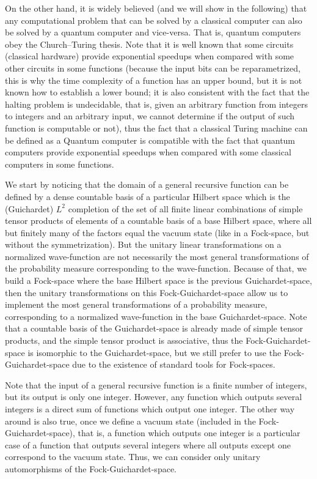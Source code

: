 \documentclass[11pt]{book}
\begin{document}
On the other hand, it is widely believed (and we will show in the
following) that any computational problem that can be solved by a
classical computer can also be solved by a quantum computer and
vice-versa. That is, quantum computers obey the Church--Turing thesis.
Note that it is well known that some circuits (classical hardware)
provide exponential speedups when compared with some other circuits in
some functions (because the input bits can be reparametrized, this is
why the time complexity of a function has an upper bound, but it is not
known how to establish a lower bound; it is also consistent with the
fact that the halting problem is undecidable, that is, given an
arbitrary function from integers to integers and an arbitrary input, we
cannot determine if the output of such function is computable or not),
thus the fact that a classical Turing machine can be defined as a
Quantum computer is compatible with the fact that quantum computers
provide exponential speedups when compared with some classical computers
in some functions.

We start by noticing that the domain of a general recursive function can
be defined by a dense countable basis of a particular Hilbert space
which is the (Guichardet) \(L^2\) completion of the set of all finite
linear combinations of simple tensor products of elements of a countable
basis of a base Hilbert space, where all but finitely many of the
factors equal the vacuum
state\cite{bratteli1987operator} (like in a Fock-space, but without the symmetrization). But the
unitary linear transformations on a normalized wave-function are not
necessarily the most general transformations of the probability measure
corresponding to the wave-function. Because of that, we build a
Fock-space where the base Hilbert space is the previous
Guichardet-space, then the unitary transformations on this
Fock-Guichardet-space allow us to implement the most general
transformations of a probability measure, corresponding to a normalized
wave-function in the base Guichardet-space. Note that a countable basis
of the Guichardet-space is already made of simple tensor products, and
the simple tensor product is associative, thus the Fock-Guichardet-space
is isomorphic to the Guichardet-space, but we still prefer to use the
Fock-Guichardet-space due to the existence of standard tools for
Fock-spaces.

Note that the input of a general recursive function is a finite number
of integers, but its output is only one integer. However, any function
which outputs several integers is a direct sum of functions which output
one integer. The other way around is also true, once we define a vacuum
state (included in the Fock-Guichardet-space), that is, a function which
outputs one integer is a particular case of a function that outputs
several integers where all outputs except one correspond to the vacuum
state. Thus, we can consider only unitary automorphisms of the
Fock-Guichardet-space.
\end{document}
